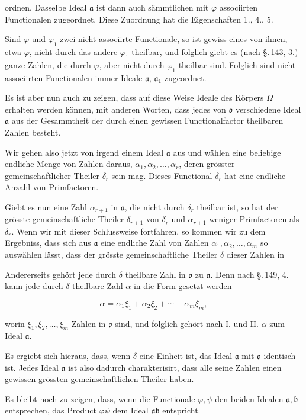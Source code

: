 ordnen. Dasselbe Ideal $\mathfrak{a}$ ist dann auch sämmtlichen mit $\varphi$
associirten Functionalen zugeordnet. Diese Zuordnung hat die
Eigenschaften 1., 4., 5.

Sind $\varphi$ und $\varphi_1$ zwei nicht associirte Functionale, so ist
gewiss eines von ihnen, etwa $\varphi$, nicht durch das andere $\varphi_1$
theilbar, und folglich giebt es (nach \S.\,143, 3.) ganze Zahlen, die
durch $\varphi$, aber nicht durch $\varphi_1$ theilbar sind. Folglich sind nicht
associirten Functionalen immer  Ideale $\mathfrak{a}$, $\mathfrak{a}_1$ zugeordnet.

Es ist aber nun auch zu zeigen, dass auf diese Weise 
Ideale des Körpers $\Omega$ erhalten werden können, mit anderen
Worten, dass jedes von $\mathfrak{o}$ verschiedene Ideal $\mathfrak{a}$ aus der Gesammtheit
der durch einen gewissen Functionalfactor theilbaren Zahlen
besteht.

Wir gehen also jetzt von irgend einem Ideal $\mathfrak{a}$ aus und
wählen eine beliebige endliche Menge von Zahlen daraus,
$\alpha_1, \alpha_2, \ldots, \alpha_r$, deren grösster gemeinschaftlicher Theiler $\delta_r$ sein
mag. Dieses Functional $\delta_r$ hat eine endliche Anzahl von Primfactoren.

Giebt es nun eine Zahl $\alpha_{r+1}$ in $\mathfrak{a}$, die nicht durch $\delta_r$ theilbar
 ist, so hat der grösste gemeinschaftliche Theiler $\delta_{r+1}$ von
$\delta_r$ und $\alpha_{r+1}$ weniger Primfactoren als $\delta_r$. Wenn wir mit dieser
Schlussweise fortfahren, so kommen wir zu dem Ergebniss, dass
sich aus $\mathfrak{a}$ eine endliche Zahl von Zahlen $\alpha_1, \alpha_2, \ldots, \alpha_m$ so auswählen
 lässt, dass der grösste gemeinschaftliche Theiler $\delta$ dieser
Zahlen in 

Andererseits gehört jede durch $\delta$ theilbare Zahl in $\mathfrak{o}$ zu $\mathfrak{a}$.
Denn nach \S.\,149, 4. kann jede durch $\delta$ theilbare Zahl $\alpha$ in die
Form gesetzt werden

\[
\alpha = \alpha_1 \xi_1 + \alpha_2 \xi_2 + \cdots + \alpha_m \xi_m,
\]

worin $\xi_1, \xi_2, \ldots, \xi_m$ Zahlen in $\mathfrak{o}$ sind, und folglich gehört nach
I. und II. $\alpha$ zum Ideal $\mathfrak{a}$.

Es ergiebt sich hieraus, dass, wenn $\delta$ eine Einheit ist, das
Ideal $\mathfrak{a}$ mit $\mathfrak{o}$ identisch ist. Jedes Ideal $\mathfrak{a}$ ist also dadurch
charakterisirt, dass alle seine Zahlen einen gewissen grössten
gemeinschaftlichen Theiler haben.

Es bleibt noch zu zeigen, dass, wenn die Functionale $\varphi, \psi$
den beiden Idealen $\mathfrak{a}, \mathfrak{b}$ entsprechen, das Product $\varphi\psi$ dem
Ideal $\mathfrak{a}\mathfrak{b}$ entspricht.
